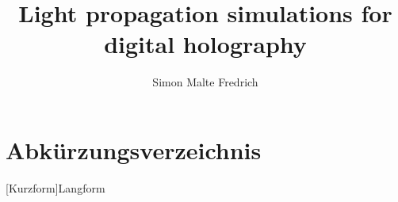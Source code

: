 \documentclass{article}
\begin{document}
\title{Light propagation simulations for digital holography}
\author{Simon Malte Fredrich}
\maketitle
\tableofcontents
\listoffigures
\listoftables
\section*{Abkürzungsverzeichnis}
\begin{acronym}
    [Kurzform]{Langform}
\end{acronym}

\newpage





% 
% 
% 





\printbibliography
\end{document}
